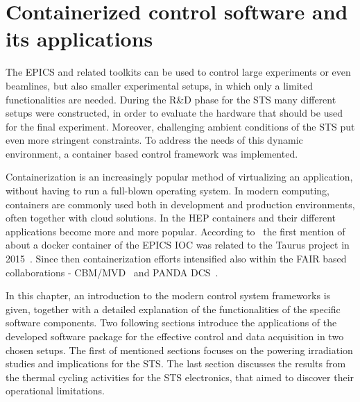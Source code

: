 \chapter{Containerized control software and its applications}
\label{containers}
The \gls{EPICS} and related toolkits can be used to control large experiments or even beamlines, but also smaller experimental setups, in which only a limited functionalities are needed. During the R\&D phase for the \gls{STS} many different setups were constructed, in order to evaluate the hardware that should be used for the final experiment. Moreover, challenging ambient conditions of the STS put even more stringent constraints. To address the needs of this dynamic environment, a container based control framework was implemented. 

Containerization is an increasingly popular method of virtualizing an application, without having to run a full-blown operating system. In modern computing, containers are commonly used both in development and production environments, often together with cloud solutions. In the \gls{HEP} containers and their different applications become more and more popular. According to~\cite{Klaus2021} the first mention of about a docker container of the \gls{EPICS} \gls{IOC} was related to the Taurus project in 2015~\cite{taurus}. Since then containerization efforts intensified also within the \gls{FAIR} based collaborations - \gls{CBM}/\gls{MVD}~\cite{Klaus2021} and PANDA DCS~\cite{PANDA_1}.

In this chapter, an introduction to the modern control system frameworks is given, together with a detailed explanation of the functionalities of the specific software components. Two following sections introduce the applications of the developed software package for the effective control and data acquisition in two chosen setups. The first of mentioned sections focuses on the powering irradiation studies and implications for the STS. The last section discusses the results from the thermal cycling activities for the STS electronics, that aimed to discover their operational limitations.
  
